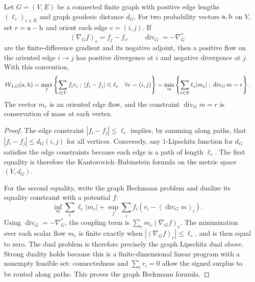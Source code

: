 \begin{prop}\label{prop-graph-w1-beckmann}
	Let $G=(V,E)$ be a connected finite graph with positive edge lengths $(\ell_e)_{e\in E}$ and graph geodesic distance $d_G$.
	For two probability vectors $\mathrm{a},\mathrm{b}$ on $V$, set $r=\mathrm{a}-\mathrm{b}$ and orient each edge $e=(i,j)$. If
	\[
		(\nabla_G f)_e=f_j-f_i,\qquad
		\operatorname{div}_G=-\nabla_G^*
	\]
	are the finite-difference gradient and its negative adjoint, then a positive flow on the oriented edge $i\to j$ has positive divergence at $i$ and negative divergence at $j$. With this convention,
	\[
		\operatorname{\mathcal{W}}_{1,G}(\mathrm{a},\mathrm{b})
		=
		\max_f \left\{ \sum_{i\in V} f_i r_i \;;\; |f_i-f_j|\leqslant \ell_e\quad\forall e=(i,j) \right\}
		=
		\min_m \left\{ \sum_{e\in E}\ell_e |m_e| \;;\; \operatorname{div}_G m=r \right\}.
	\]
	The vector $m_e$ is an oriented edge flow, and the constraint $\operatorname{div}_G m=r$ is conservation of mass at each vertex.
\end{prop}

\begin{proof}
	The edge constraint $|f_i-f_j|\leq\ell_e$ implies, by summing along paths, that $|f_i-f_j|\leq d_G(i,j)$ for all vertices. Conversely, any $1$-Lipschitz function for $d_G$ satisfies the edge constraints because each edge is a path of length $\ell_e$. The first equality is therefore the Kantorovich--Rubinstein formula on the metric space $(V,d_G)$.

	For the second equality, write the graph Beckmann problem and dualize its equality constraint with a potential $f$:
	\[
		\inf_m \sum_e\ell_e|m_e|
		+\sup_f \sum_i f_i(r_i-(\operatorname{div}_G m)_i).
	\]
	Using $\operatorname{div}_G=-\nabla_G^*$, the coupling term is $\sum_e m_e(\nabla_G f)_e$. The minimization over each scalar flow $m_e$ is finite exactly when $|(\nabla_G f)_e|\leq\ell_e$, and is then equal to zero. The dual problem is therefore precisely the graph Lipschitz dual above. Strong duality holds because this is a finite-dimensional linear program with a nonempty feasible set: connectedness and $\sum_i r_i=0$ allow the signed surplus to be routed along paths. This proves the graph Beckmann formula.
\end{proof}

